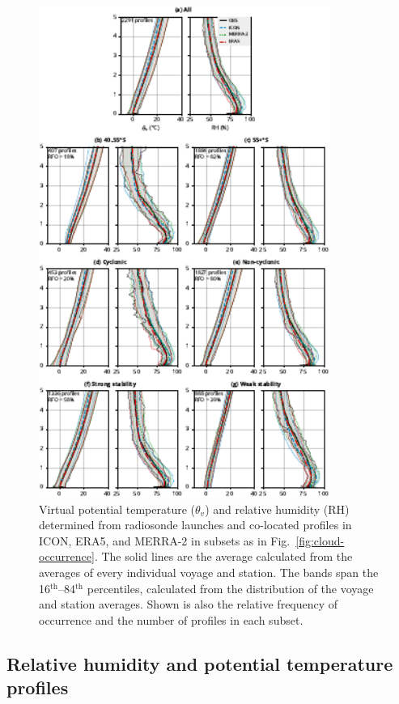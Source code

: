 \documentclass[draft]{agujournal2019}
\begin{document}
\begin{figure}[p!]
\centering
\includegraphics[width=0.85\textwidth]{img/rs_agg_rev1.pdf}
\caption{
Virtual potential temperature ($\theta_v$) and relative humidity (RH) determined from radiosonde launches and co-located profiles in ICON, ERA5, and MERRA-2 in subsets as in Fig.~\ref{fig:cloud-occurrence}. The solid lines are the average calculated from the averages of every individual voyage and station. The bands span the 16$^\mathrm{th}$–84$^\mathrm{th}$ percentiles, calculated from the distribution of the voyage and station averages. Shown is also the relative frequency of occurrence and the number of profiles in each subset.
}
\label{fig:potential-temperature}
\end{figure}

\subsection{Relative humidity and potential temperature profiles}
\label{sec:thermodynamic-profiles}
\end{document}
